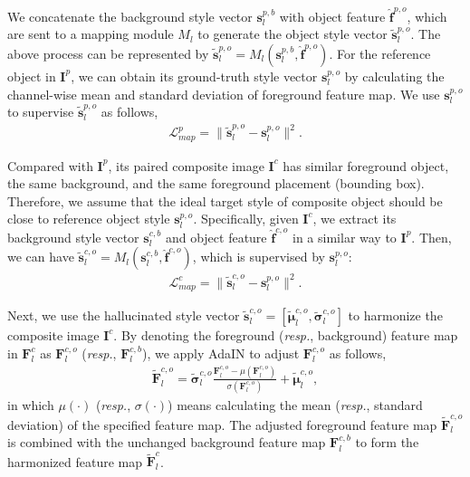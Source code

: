 \documentclass[letterpaper]{article} %
\begin{document}
We concatenate the background style vector $\bm{s}^{p,b}_l$ with object feature $\hat{\bm{f}}^{p,o}$, which are sent to a mapping module $M_l$ to generate the object style vector $\tilde{\bm{s}}^{p,o}_l$.
The above process can be represented by $\tilde{\bm{s}}^{p,o}_l=M_l(\bm{s}^{p,b}_l, \hat{\bm{f}}^{p,o})$.
For the reference object in  $\bm{I}^p$, we can obtain its ground-truth style vector $\bm{s}^{p,o}_l$ by calculating the channel-wise mean and standard deviation of foreground feature map. We use $\bm{s}^{p,o}_l$ to supervise $\tilde{\bm{s}}^{p,o}_l$ as follows,
\begin{eqnarray}
\mathcal{L}_{map}^p = \|\tilde{\bm{s}}^{p,o}_l-\bm{s}^{p,o}_l\|^2.
\end{eqnarray}

Compared with $\bm{I}^p$, its paired composite image $\bm{I}^c$ has similar foreground object, the same background, and the same foreground placement (bounding box). Therefore, we assume that the ideal target style of composite object should be close to reference object style $\bm{s}^{p,o}_l$.
Specifically, given $\bm{I}^c$, we extract its background style vector $\bm{s}^{c,b}_l$ and object feature $\hat{\bm{f}}^{c,o}$ in a similar way to $\bm{I}^p$. Then, we can have $\tilde{\bm{s}}^{c,o}_l=M_l(\bm{s}^{c,b}_l, \hat{\bm{f}}^{c,o})$, which is supervised by $\bm{s}^{p,o}_l$:
\begin{eqnarray}
\mathcal{L}_{map}^c = \|\tilde{\bm{s}}^{c,o}_l-\bm{s}^{p,o}_l\|^2.
\end{eqnarray}

Next, we use the hallucinated style vector $\tilde{\bm{s}}^{c,o}_l=[\tilde{\bm{\mu}}^{c,o}_l, \tilde{\bm{\sigma}}^{c,o}_l]$ to harmonize the composite image  $\bm{I}^c$. By denoting the foreground (\emph{resp.}, background) feature map in $\bm{F}_l^c$ as $\bm{F}^{c,o}_l$ (\emph{resp.}, $\bm{F}^{c,b}_l$), we apply AdaIN to adjust $\bm{F}^{c,o}_l$ as follows,
\begin{eqnarray}\label{eqn:adain}
\tilde{\bm{F}}^{c,o}_{l} = \tilde{\bm{\sigma}}^{c,o}_l\frac{\bm{F}^{c,o}_l-\mu(\bm{F}^{c,o}_l)}{\sigma(\bm{F}^{c,o}_l)} + \tilde{\bm{\mu}}^{c,o}_l,
\end{eqnarray}
in which $\mu(\cdot)$ (\emph{resp.}, $\sigma(\cdot)$) means calculating the mean (\emph{resp.}, standard deviation) of the specified feature map. The adjusted foreground feature map $\tilde{\bm{F}}^{c,o}_{l}$ is combined with the unchanged background feature map $\bm{F}^{c,b}_l$ to form the harmonized feature map $\tilde{\bm{F}}^{c}_{l}$.
\end{document}
